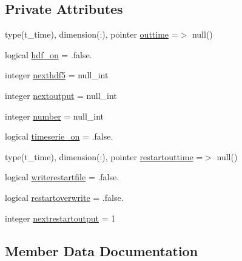 \subsection*{Private Attributes}
\begin{DoxyCompactItemize}
\item 
type(t\+\_\+time), dimension(\+:), pointer \mbox{\hyperlink{structmodulevegetation_1_1t__output_a47877320be854d4ab3088c6bbeac9824}{outtime}} =$>$ null()
\item 
logical \mbox{\hyperlink{structmodulevegetation_1_1t__output_ae187d47891ed85cbd3937fd0de36396c}{hdf\+\_\+on}} = .false.
\item 
integer \mbox{\hyperlink{structmodulevegetation_1_1t__output_aeb5fb14ca370e68082faffbe85721850}{nexthdf5}} = null\+\_\+int
\item 
integer \mbox{\hyperlink{structmodulevegetation_1_1t__output_a0fc2440be18b90d53c37c1fb9f97f400}{nextoutput}} = null\+\_\+int
\item 
integer \mbox{\hyperlink{structmodulevegetation_1_1t__output_abfd25fb972996be9b164597dc8deb4e2}{number}} = null\+\_\+int
\item 
logical \mbox{\hyperlink{structmodulevegetation_1_1t__output_a3297acacbcaa641f26601b18b392a251}{timeserie\+\_\+on}} = .false.
\item 
type(t\+\_\+time), dimension(\+:), pointer \mbox{\hyperlink{structmodulevegetation_1_1t__output_a90b0b2b700d9020b105c824f50aff1ab}{restartouttime}} =$>$ null()
\item 
logical \mbox{\hyperlink{structmodulevegetation_1_1t__output_a2973f57c15929e1af26c360c823fd489}{writerestartfile}} = .false.
\item 
logical \mbox{\hyperlink{structmodulevegetation_1_1t__output_afb51395dd5cd268ef079d2b6b92d4288}{restartoverwrite}} = .false.
\item 
integer \mbox{\hyperlink{structmodulevegetation_1_1t__output_adf05eb81f7a8304b4fa2e822c295f8d2}{nextrestartoutput}} = 1
\end{DoxyCompactItemize}


\subsection{Member Data Documentation}
\mbox{\label{structmodulevegetation_1_1t__output_ae187d47891ed85cbd3937fd0de36396c}} 
